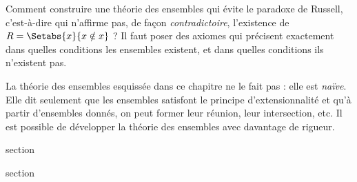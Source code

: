 \documentclass[11pt,a4paper,openany]{memoir}
\begin{document}
\begin{digress}
Comment construire une théorie des ensembles qui évite
le paradoxe de Russell, c'est-à-dire qui n'affirme pas,
de façon \emph{contradictoire}, l'existence de
$R = \Setabs{x}{x \notin x}$ ?
Il faut poser des axiomes qui précisent exactement
dans quelles conditions les ensembles existent,
et dans quelles conditions ils n'existent pas.

La théorie des ensembles esquissée dans ce chapitre
ne le fait pas : elle est \emph{naïve}.
Elle dit seulement que les ensembles satisfont le principe
d'extensionnalité et qu'à partir d'ensembles donnés, on peut
former leur réunion, leur intersection, etc.
Il est possible de développer la théorie des ensembles
avec davantage de rigueur. 
\end{digress}



\endgroup


\OLEndChapterHook


\endgroup


\begingroup
\expandafter\def\csname ol@sectioncs\endcsname{section}
\def\olfilename{relations-complete}




\begingroup
\expandafter\def\csname ol@sectioncs\endcsname{section}
\def\olfilename{relations-as-sets}


\end{document}
